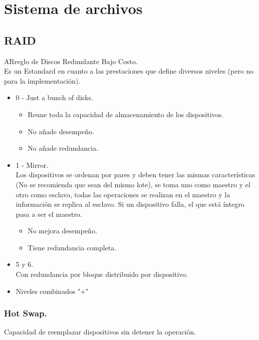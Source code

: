 \newpage
\part{Sistema de archivos}
\chapter{RAID}
ARreglo de Discos Redundante Bajo Costo.\\
Es un Estandard en cuanto a las prestaciones que define diversos niveles (pero no para la implementaci\'{o}n).
\begin{itemize}
	\item 0 - Just a bunch of disks.
	\begin{itemize}
		\item Reune toda la capacidad de almacenamiento de los dispositivos.
		\item No a\~{n}ade desempe\~{n}o.
		\item No a\~{n}ade redundancia.
	\end{itemize}
	\item 1 - Mirror.\\
		Los dispositivos se ordenan por pares y deben tener las mismas caracter\'{i}sticas (No se recomienda que sean del mismo lote), se toma uno como maestro y el otro como esclavo, todas las operaciones se realizan en el maestro y la informaci\'{o}n se replica al esclavo. Si un dispositivo falla, el que est\'{a} \'{i}ntegro pasa a ser el maestro.
	\begin{itemize}
		\item No mejora desempe\~{n}o.
		\item Tiene redundancia completa.
	\end{itemize}
	\item 5 y 6.\\
		Con redundancia por bloque distribuido por dispositivo.
	\item Niveles combinados "+"
\end{itemize}

\section{Hot Swap.}
Capacidad de reemplazar dispositivos sin detener la operaci\'{o}n.
